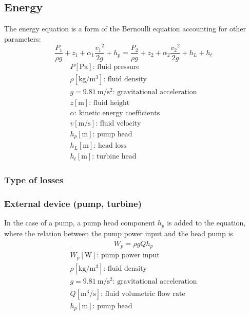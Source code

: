 \documentclass[10pt, twocolumn]{article}
\begin{document}
\subsection{Energy}
The energy equation is a form of the Bernoulli equation accounting for other parameters:
\[
  \frac{P_1}{\rho g} + z_1 + \alpha_1 \frac{{v_1}^2}{2g} + h_p = \frac{P_2}{\rho g} + z_2 + \alpha_2 \frac{{v_2}^2}{2g} + h_L + h_t
\]
\[
  \begin{array}{|l}
    P [\si{\pascal}] \text{: fluid pressure}                                     \\
    \rho [\si{\kilogram\per\metre\cubed}] \text{: fluid density}                 \\
    g = \SI{9.81}{\metre\per\second\squared} \text{: gravitational acceleration} \\
    z [\si{\metre}] \text{: fluid height}                                        \\
    \alpha \text{: kinetic energy coefficients}                                  \\
    v [\si{\metre\per\second}] \text{: fluid velocity}                           \\
    h_p [\si{\metre}] \text{: pump head}                                         \\
    h_L [\si{\metre}] \text{: head loss}                                         \\
    h_t [\si{\metre}] \text{: turbine head}
  \end{array}
\]


\subsubsection{Type of losses}



\subsubsection{External device (pump, turbine)}
In the case of a pump, a pump head component \(h_p\) is added to the equation, where the relation between the pump power input and the head pump is
\[
  \dot{W}_p = \rho g Q h_p
\]
\[
  \begin{array}{|l}
    \dot{W}_p [\si{\watt}] \text{: pump power input}                             \\
    \rho [\si{\kilogram\per\metre\cubed}] \text{: fluid density}                 \\
    g = \SI{9.81}{\metre\per\second\squared} \text{: gravitational acceleration} \\
    Q [\si{\metre\cubed\per\second}] \text{: fluid volumetric flow rate}         \\
    h_p [\si{\metre}] \text{: pump head}
  \end{array}
\]
\end{document}
